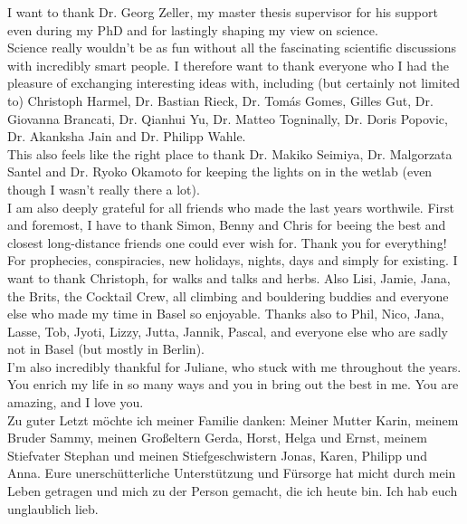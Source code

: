I want to thank Dr. Georg Zeller, my master thesis supervisor for his support even during my PhD and for lastingly shaping my view on science. \\

Science really wouldn't be as fun without all the fascinating scientific discussions with incredibly smart people. I therefore want to thank everyone who I had the pleasure of exchanging interesting ideas with, including (but certainly not limited to) Christoph Harmel, Dr. Bastian Rieck, Dr. Tomás Gomes, Gilles Gut, Dr. Giovanna Brancati, Dr. Qianhui Yu, Dr. Matteo Togninally, Dr. Doris Popovic, Dr. Akanksha Jain and Dr. Philipp Wahle. \\

This also feels like the right place to thank Dr. Makiko Seimiya, Dr. Malgorzata Santel and Dr. Ryoko Okamoto for keeping the lights on in the wetlab (even though I wasn't really there a lot). \\

I am also deeply grateful for all friends who made the last years worthwile. First and foremost, I have to thank Simon, Benny and Chris for beeing the best and closest long-distance friends one could ever wish for. Thank you for everything! For prophecies, conspiracies, new holidays, nights, days and simply for existing. I want to thank  Christoph, for walks and talks and herbs. Also Lisi, Jamie, Jana, the Brits, the Cocktail Crew, all climbing and bouldering buddies and everyone else who made my time in Basel so enjoyable. Thanks also to Phil, Nico, Jana, Lasse, Tob, Jyoti, Lizzy, Jutta, Jannik, Pascal, and everyone else who are sadly not in Basel (but mostly in Berlin). \\

I'm also incredibly thankful for Juliane, who stuck with me throughout the years. You enrich my life in so many ways and you in bring out the best in me. You are amazing, and I love you. \\

Zu guter Letzt möchte ich meiner Familie danken: Meiner Mutter Karin, meinem Bruder Sammy, meinen Großeltern Gerda, Horst, Helga und Ernst, meinem Stiefvater Stephan und meinen Stiefgeschwistern Jonas, Karen, Philipp und Anna. Eure unerschütterliche Unterstützung und Fürsorge hat micht durch mein Leben getragen und mich zu der Person gemacht, die ich heute bin. Ich hab euch unglaublich lieb. 



